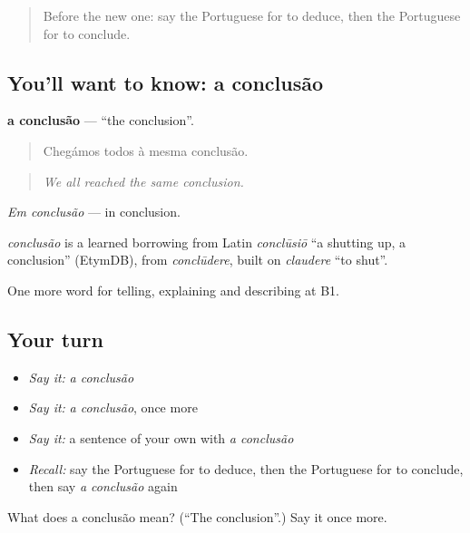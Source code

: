 \begin{quote}
Before the new one: say the Portuguese for to deduce, then the Portuguese for to conclude.
\end{quote}

\subsection*{You'll want to know: a conclusão}
\textbf{a conclusão} — \textquotedblleft{}the conclusion\textquotedblright{}.

\begin{quote}
Chegámos todos à mesma conclusão.
\end{quote}

\begin{quote}
\emph{We all reached the same conclusion.}
\end{quote}

\emph{Em conclusão} — in conclusion.

\begin{cousinweb}
\emph{conclusão} is a learned borrowing from Latin \emph{conclūsiō} \textquotedblleft{}a shutting up, a conclusion\textquotedblright{} (EtymDB), from \emph{conclūdere}, built on \emph{claudere} \textquotedblleft{}to shut\textquotedblright{}.
\end{cousinweb}

\begin{grammarlens}[title={What you've built}]
One more word for telling, explaining and describing at B1.
\end{grammarlens}

\subsection*{Your turn}
\begin{itemize}
\raggedright
  \item \emph{Say it:} \emph{a conclusão}
  \item \emph{Say it:} \emph{a conclusão}, once more
  \item \emph{Say it:} a sentence of your own with \emph{a conclusão}
  \item \emph{Recall:} say the Portuguese for to deduce, then the Portuguese for to conclude, then say \emph{a conclusão} again
\end{itemize}

\begin{tcolorbox}[breakable,colback=teal!4,colframe=teal!35!black,title={Before you move on}]
What does a conclusão mean? (\textquotedblleft{}The conclusion\textquotedblright{}.) Say it once more.
\end{tcolorbox}
